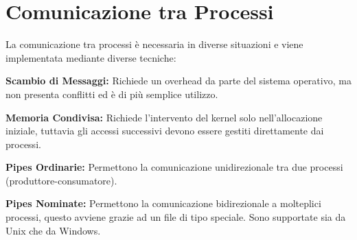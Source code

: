\section{Comunicazione tra Processi}
La comunicazione tra processi è necessaria in diverse situazioni e viene implementata mediante diverse tecniche:
\begin{sitemize}
    \item \textbf{Scambio di Messaggi:} Richiede un overhead da parte del sistema operativo, ma non presenta conflitti ed è di più semplice utilizzo.
    \item \textbf{Memoria Condivisa:} Richiede l'intervento del kernel solo nell'allocazione iniziale, tuttavia gli accessi successivi devono essere gestiti direttamente dai processi.
    \item \textbf{Pipes Ordinarie:} Permettono la comunicazione unidirezionale tra due processi (produttore-consumatore).
    \item \textbf{Pipes Nominate:} Permettono la comunicazione bidirezionale a molteplici processi, questo avviene grazie ad un file di tipo speciale. Sono supportate sia da Unix che da Windows.
\end{sitemize}